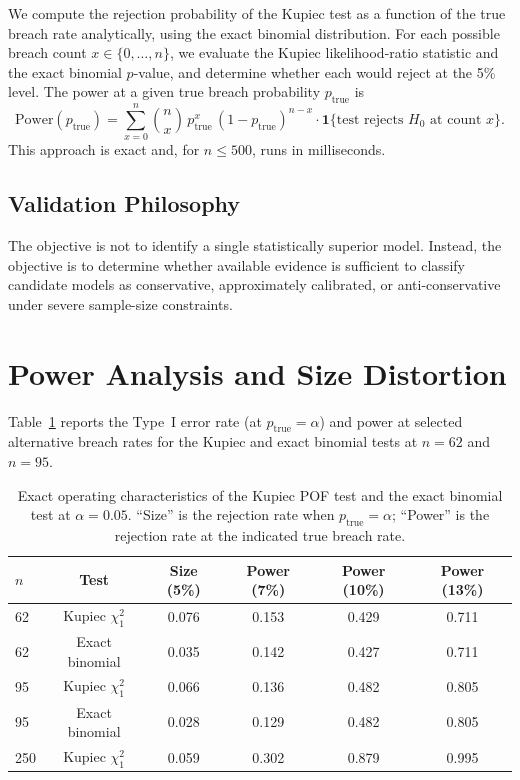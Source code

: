 \documentclass[12pt,a4paper]{article}
\begin{document}
We compute the rejection probability of the Kupiec test as a function of the true breach rate analytically, using the exact binomial distribution. For each possible breach count $x \in \{0, \dots, n\}$, we evaluate the Kupiec likelihood-ratio statistic and the exact binomial $p$-value, and determine whether each would reject at the 5\% level. The power at a given true breach probability $p_{\text{true}}$ is
\begin{equation}
\mathrm{Power}(p_{\text{true}}) = \sum_{x=0}^{n} \binom{n}{x} \, p_{\text{true}}^{x} \, (1-p_{\text{true}})^{n-x} \cdot \mathbf{1}\{\text{test rejects } H_0 \text{ at count } x\}.
\end{equation}
This approach is exact and, for $n \le 500$, runs in milliseconds.

\subsection{Validation Philosophy}

The objective is not to identify a single statistically superior model. Instead, the objective is to determine whether available evidence is sufficient to classify candidate models as conservative, approximately calibrated, or anti-conservative under severe sample-size constraints.

\section{Power Analysis and Size Distortion}

Table~\ref{tab:power} reports the Type~I error rate (at $p_{\text{true}} = \alpha$) and power at selected alternative breach rates for the Kupiec and exact binomial tests at $n = 62$ and $n = 95$.

\begin{table}[H]
\centering
\caption{Exact operating characteristics of the Kupiec POF test and the exact binomial test at $\alpha = 0.05$. ``Size'' is the rejection rate when $p_{\text{true}} = \alpha$; ``Power'' is the rejection rate at the indicated true breach rate.}
\label{tab:power}
\begin{tabular}{lccccc}
\toprule
$n$ & Test & Size (5\%) & Power (7\%) & Power (10\%) & Power (13\%) \\
\midrule
62  & Kupiec $\chi^2_1$ & 0.076 & 0.153 & 0.429 & 0.711 \\
62  & Exact binomial    & 0.035 & 0.142 & 0.427 & 0.711 \\
95  & Kupiec $\chi^2_1$ & 0.066 & 0.136 & 0.482 & 0.805 \\
95  & Exact binomial    & 0.028 & 0.129 & 0.482 & 0.805 \\
250 & Kupiec $\chi^2_1$ & 0.059 & 0.302 & 0.879 & 0.995 \\
\bottomrule
\end{tabular}
\end{table}
\end{document}
